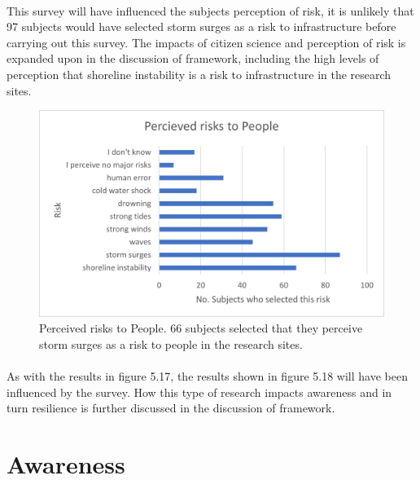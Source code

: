 \paragraph{}
This survey will have influenced the subjects perception of risk, it is unlikely that 97 subjects would have selected storm surges as a risk to infrastructure before carrying out this survey. The impacts of citizen science and perception of risk is expanded upon in the discussion of framework, including the high levels of perception that shoreline instability is a risk to infrastructure in the research sites.


\begin{figure}[H]
    \centering
    \includegraphics{fig_results/people-risks.png}
    \caption{Perceived risks to People. 66 subjects selected that they perceive storm surges as a risk to people in the research sites. }
    \label{fig:my_label}
\end{figure}
\paragraph{}

As with the results in figure 5.17, the results shown in figure 5.18 will have been influenced by the survey. How this type of research impacts awareness and in turn resilience is further discussed in the discussion of framework. 


\section{Awareness}

